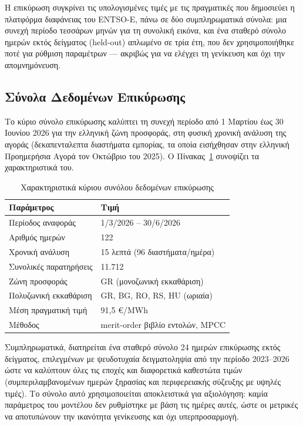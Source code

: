 Η επικύρωση συγκρίνει τις υπολογισμένες τιμές με τις πραγματικές που δημοσιεύει η πλατφόρμα διαφάνειας του ENTSO-E, πάνω σε δύο συμπληρωματικά σύνολα: μια συνεχή περίοδο τεσσάρων μηνών για τη συνολική εικόνα, και ένα σταθερό σύνολο ημερών εκτός δείγματος (held-out) απλωμένο σε τρία έτη, που δεν χρησιμοποιήθηκε ποτέ για ρύθμιση παραμέτρων --- ακριβώς για να ελέγχει τη γενίκευση και όχι την απομνημόνευση.

\subsection{Σύνολα Δεδομένων Επικύρωσης}
\label{subsec:validation-dataset}

Το κύριο σύνολο επικύρωσης καλύπτει τη συνεχή περίοδο από 1 Μαρτίου έως 30 Ιουνίου 2026 για την ελληνική ζώνη προσφοράς, στη φυσική χρονική ανάλυση της αγοράς (δεκαπενταλεπτα διαστήματα εμπορίας, τα οποία εισήχθησαν στην ελληνική Προημερήσια Αγορά τον Οκτώβριο του 2025). Ο Πίνακας~\ref{tab:validation-dataset} συνοψίζει τα χαρακτηριστικά του.

\begin{table}[htbp]
\centering
\caption{Χαρακτηριστικά κύριου συνόλου δεδομένων επικύρωσης}
\label{tab:validation-dataset}
\begin{tabular}{@{}ll@{}}
\toprule
\textbf{Παράμετρος} & \textbf{Τιμή} \\
\midrule
Περίοδος αναφοράς & 1/3/2026 -- 30/6/2026 \\
Αριθμός ημερών & 122 \\
Χρονική ανάλυση & 15 λεπτά (96 διαστήματα/ημέρα) \\
Συνολικές παρατηρήσεις & 11.712 \\
Ζώνη προσφοράς & GR (μονοζωνική εκκαθάριση) \\
Πολυζωνική εκκαθάριση & GR, BG, RO, RS, HU (ωριαία) \\
Μέση πραγματική τιμή & 91,5 €/MWh \\
Μέθοδος & merit-order βιβλίο εντολών, MPCC \\
\bottomrule
\end{tabular}
\end{table}

Συμπληρωματικά, διατηρείται ένα σταθερό σύνολο 24 ημερών επικύρωσης εκτός δείγματος, επιλεγμένων με ψευδοτυχαία δειγματοληψία από την περίοδο 2023--2026 ώστε να καλύπτουν όλες τις εποχές και διαφορετικά καθεστώτα τιμών (συμπεριλαμβανομένων ημερών ξηρασίας και περιφερειακής σύζευξης με υψηλές τιμές). Το σύνολο αυτό χρησιμοποιείται αποκλειστικά για αξιολόγηση: καμία παράμετρος του μοντέλου δεν ρυθμίστηκε με βάση τις ημέρες αυτές, ώστε οι μετρικές να αποτυπώνουν την ικανότητα γενίκευσης και όχι υπερπροσαρμογή.

